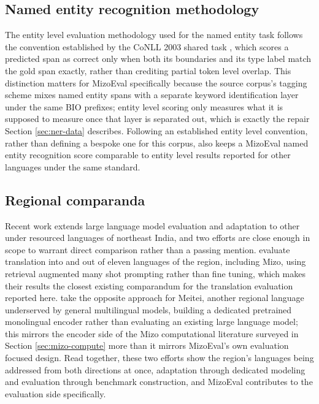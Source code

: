 \documentclass[pdflatex,sn-mathphys-ay]{sn-jnl}
\begin{document}
\subsection{Named entity recognition methodology}

The entity level evaluation methodology used for the named entity task follows the convention established by the CoNLL 2003 shared task \citep{tjongkimsang2003conll}, which scores a predicted span as correct only when both its boundaries and its type label match the gold span exactly, rather than crediting partial token level overlap. This distinction matters for MizoEval specifically because the source corpus's tagging scheme mixes named entity spans with a separate keyword identification layer under the same BIO prefixes; entity level scoring only measures what it is supposed to measure once that layer is separated out, which is exactly the repair Section \ref{sec:ner-data} describes. Following an established entity level convention, rather than defining a bespoke one for this corpus, also keeps a MizoEval named entity recognition score comparable to entity level results reported for other languages under the same standard.

\subsection{Regional comparanda}

Recent work extends large language model evaluation and adaptation to other under resourced languages of northeast India, and two efforts are close enough in scope to warrant direct comparison rather than a passing mention. \citet{dhawan2026bm25} evaluate translation into and out of eleven languages of the region, including Mizo, using retrieval augmented many shot prompting rather than fine tuning, which makes their results the closest existing comparandum for the translation evaluation reported here. \citet{nyalang2026meiteiroberta} take the opposite approach for Meitei, another regional language underserved by general multilingual models, building a dedicated pretrained monolingual encoder rather than evaluating an existing large language model; this mirrors the encoder side of the Mizo computational literature surveyed in Section \ref{sec:mizo-compute} more than it mirrors MizoEval's own evaluation focused design. Read together, these two efforts show the region's languages being addressed from both directions at once, adaptation through dedicated modeling and evaluation through benchmark construction, and MizoEval contributes to the evaluation side specifically.
\end{document}

